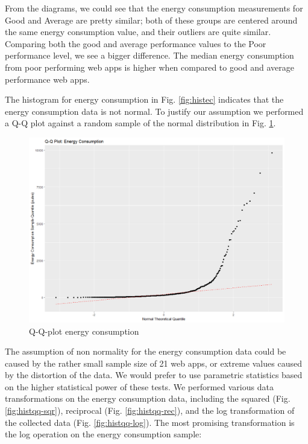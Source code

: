 From the diagrams, we could see that the energy consumption measurements for Good and Average are pretty similar; both of these groups are centered around the same energy consumption value, and their outliers are quite similar. Comparing both the good and average performance values to the Poor performance level, we see a bigger difference. The median energy consumption from poor performing web apps is higher when compared to good and average performance web apps. \newline

The histogram for energy consumption in Fig. \ref{fig:histec} indicates that the energy consumption data is not normal. To justify our assumption we performed a Q-Q plot against a random sample of the normal distribution in Fig. \ref{fig:qqec}.

\begin{figure}[H]
  \includegraphics[width=\linewidth]{./NewImages/Fig_7_QQPLOT_RAW.png}
  \caption{Q-Q-plot energy consumption}
  \label{fig:qqec}
\end{figure}

The assumption of non normality for the energy consumption data could be caused by the rather small sample size of 21 web apps, or extreme values caused by the distortion of the data. We would prefer to use parametric statistics based on the higher statistical power of these tests. We performed various data transformations on the energy consumption data, including the squared (Fig. \ref{fig:histqq-sqr}), reciprocal (Fig. \ref{fig:histqq-rec}), and the log transformation of the collected data (Fig. \ref{fig:histqq-log}). The most promising transformation is the log operation on the energy consumption sample:

